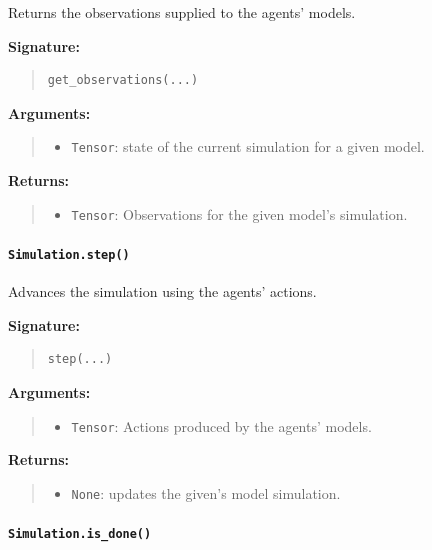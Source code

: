 \documentclass[11pt]{article}
\begin{document}
Returns the observations supplied to the agents' models.

\textbf{Signature:}
\begin{quote}
\begin{verbatim}
get_observations(...)
\end{verbatim}
\end{quote}

\textbf{Arguments:}
\begin{quote}
\begin{itemize}
    \item \texttt{Tensor}: state of the current simulation for a given model.
\end{itemize}
\end{quote}

\textbf{Returns:}
\begin{quote}
\begin{itemize}
    \item \texttt{Tensor}: Observations for the given model's simulation.
\end{itemize}
\end{quote}

\paragraph{\texttt{Simulation.step()}}

Advances the simulation using the agents' actions.

\textbf{Signature:}
\begin{quote}
\begin{verbatim}
step(...)
\end{verbatim}
\end{quote}

\textbf{Arguments:}
\begin{quote}
\begin{itemize}
    \item \texttt{Tensor}: Actions produced by the agents' models.
\end{itemize}
\end{quote}

\textbf{Returns:}
\begin{quote}
\begin{itemize}
    \item \texttt{None}: updates the given's model simulation.
\end{itemize}
\end{quote}

\paragraph{\texttt{Simulation.is\_done()}}
\end{document}
